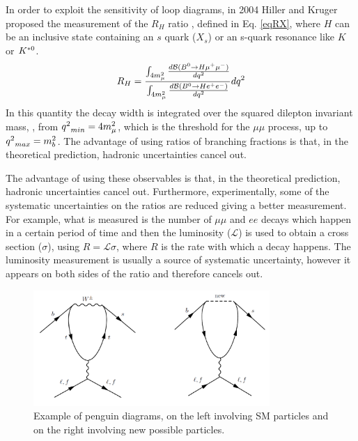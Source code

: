 In order to exploit the sensitivity of loop diagrams, in 2004 Hiller and Kruger proposed the measurement 
of the $R_H$ ratio \cite{Hiller:2003js}, defined in Eq. \ref{eqRX}, where $H$ can be an inclusive state containing 
an $s$ quark ($X_s$) or an s-quark resonance like $K$ or ${{K}^{*0}}$.
\begin{equation}
\label{eqRX}
R_{H} = \frac{\int_{4m_{\mu}^2} \frac{ d{\cal B}({{B}^0} \rightarrow H {\mu^+\mu^-}) }{d{q^2}}}{ \int_{4m_{\mu}^2}\frac{ d{\cal B}({{B}^0} \rightarrow H{e^+e^-}) }{d{q^2}}} d{q^2}
\end{equation}
In this quantity the decay width is integrated over the squared dilepton invariant mass, \qsq, from 
${q^2}_{min} = 4m_{\mu}^2$, which is the threshold for the $\mu\mu$ process, up to ${q^2}_{max} = m_b^2$. 
The advantage of using ratios of branching fractions is that, in the theoretical prediction, hadronic uncertainties 
cancel out.  

The advantage of using these observables is that, in the theoretical prediction, hadronic uncertainties 
cancel out. Furthermore, experimentally, some of the systematic uncertainties on the ratios are reduced
giving a better measurement. For example, what is measured is the number of $\mu\mu$ and $ee$ decays 
which happen in a  certain period of time and then the luminosity ($\mathcal{L}$) is used to obtain a
cross section ($\sigma$), using $R = \mathcal{L}\sigma$, where $R$ is the rate with which a decay happens. 
The luminosity measurement is usually a source of systematic uncertainty, however it appears on both
sides of the ratio and therefore cancels out.

\begin{figure}[h]
\centering \includegraphics[width=0.8\textwidth]{RKst/figs/penguins.png}
\caption{Example of penguin diagrams, on the left involving SM particles and on the right 
involving new possible particles.}
\label{fig:NPpenguins}
\end{figure}

